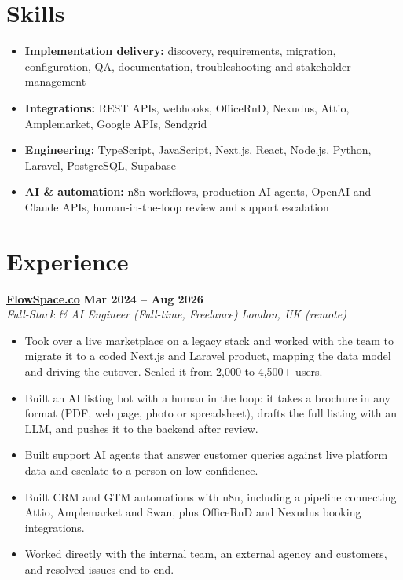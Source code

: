 \documentclass[a4paper,10pt]{article}
\newcommand{\role}[4]{%
 \textbf{#1} \hfill \textbf{#2}\\[1pt]%
 \textit{#3} \hfill \textit{#4}\\[2pt]%
}
\begin{document}
\section{Skills}
\begin{itemize}
 \item \textbf{Implementation delivery:} discovery, requirements, migration, configuration, QA, documentation, troubleshooting and stakeholder management
 \item \textbf{Integrations:} REST APIs, webhooks, OfficeRnD, Nexudus, Attio, Amplemarket, Google APIs, Sendgrid
 \item \textbf{Engineering:} TypeScript, JavaScript, Next.js, React, Node.js, Python, Laravel, PostgreSQL, Supabase
 \item \textbf{AI \& automation:} n8n workflows, production AI agents, OpenAI and Claude APIs, human-in-the-loop review and support escalation
\end{itemize}

\section{Experience}

\role{\href{https://flowspace.co}{FlowSpace.co}}{Mar 2024 -- Aug 2026}{Full-Stack \& AI Engineer (Full-time, Freelance)}{London, UK (remote)}
\begin{itemize}
 \item Took over a live marketplace on a legacy stack and worked with the team to migrate it to a coded Next.js and Laravel product, mapping the data model and driving the cutover. Scaled it from 2,000 to 4,500+ users.
 \item Built an AI listing bot with a human in the loop: it takes a brochure in any format (PDF, web page, photo or spreadsheet), drafts the full listing with an LLM, and pushes it to the backend after review.
 \item Built support AI agents that answer customer queries against live platform data and escalate to a person on low confidence.
 \item Built CRM and GTM automations with n8n, including a pipeline connecting Attio, Amplemarket and Swan, plus OfficeRnD and Nexudus booking integrations.
 \item Worked directly with the internal team, an external agency and customers, and resolved issues end to end.
\end{itemize}
\end{document}
